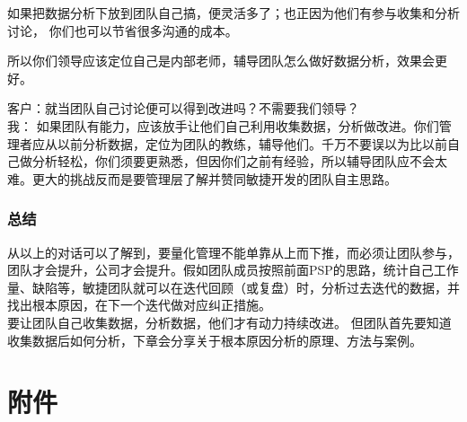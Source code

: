 如果把数据分析下放到团队自己搞，便灵活多了；也正因为他们有参与收集和分析讨论，
你们也可以节省很多沟通的成本。

所以你们领导应该定位自己是内部老师，辅导团队怎么做好数据分析，效果会更好。

客户：就当团队自己讨论便可以得到改进吗？不需要我们领导？\\
我：
如果团队有能力，应该放手让他们自己利用收集数据，分析做改进。你们管理者应从以前分析数据，定位为团队的教练，辅导他们。千万不要误以为比以前自己做分析轻松，你们须要更熟悉，但因你们之前有经验，所以辅导团队应不会太难。更大的挑战反而是要管理层了解并赞同敏捷开发的团队自主思路。


\hypertarget{ux603bux7ed3}{%
\subsubsection{总结}\label{ux603bux7ed3}}

从以上的对话可以了解到，要量化管理不能单靠从上而下推，而必须让团队参与，团队才会提升，公司才会提升。假如团队成员按照前面PSP的思路，统计自己工作量、缺陷等，敏捷团队就可以在迭代回顾（或复盘）时，分析过去迭代的数据，并找出根本原因，在下一个迭代做对应纠正措施。\\
要让团队自己收集数据，分析数据，他们才有动力持续改进。
但团队首先要知道收集数据后如何分析，下章会分享关于根本原因分析的原理、方法与案例。

\hypertarget{ux9644ux4ef6}{%
\section{附件}\label{ux9644ux4ef6}}

